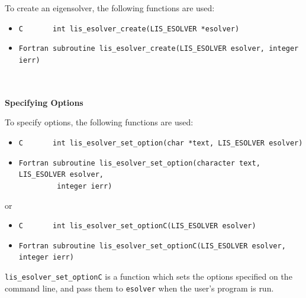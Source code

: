 \documentclass[a4paper]{article}
\begin{document}
To create an eigensolver, the following functions are used:
\begin{itemize}
\item \verb|C       int lis_esolver_create(LIS_ESOLVER *esolver)|
\item \verb|Fortran subroutine lis_esolver_create(LIS_ESOLVER esolver, integer ierr) |
\end{itemize}
 \ \\ \\
\noindent
{\bf Specifying Options}

To specify options, 
the following functions are used:
\begin{itemize}
\item \verb|C       int lis_esolver_set_option(char *text, LIS_ESOLVER esolver)|
\item \verb|Fortran subroutine lis_esolver_set_option(character text, LIS_ESOLVER esolver,|\\
      \verb|         integer ierr)|
\end{itemize}
or
\begin{itemize}
\item \verb|C       int lis_esolver_set_optionC(LIS_ESOLVER esolver)|
\item \verb|Fortran subroutine lis_esolver_set_optionC(LIS_ESOLVER esolver, integer ierr)|
\end{itemize}
\verb|lis_esolver_set_optionC| is a function which sets the options specified 
on the command line, and pass them to \verb|esolver| when the user's program is run. 
\end{document}
